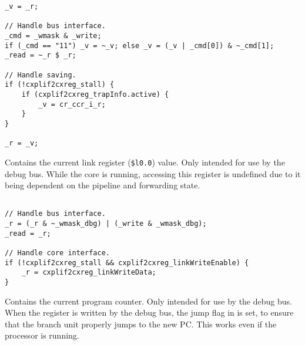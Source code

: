 \declaration{}
\implementation{}
\begin{lstlisting}
_v = _r;

// Handle bus interface.
_cmd = _wmask & _write;
if (_cmd == "11") _v = ~_v; else _v = (_v | _cmd[0]) & ~_cmd[1];
_read = ~_r $ _r;

// Handle saving.
if (!cxplif2cxreg_stall) {
    if (cxplif2cxreg_trapInfo.active) {
        _v = cr_ccr_i_r;
    }
}

_r = _v;
\end{lstlisting}


Contains the current link register (\texttt{\$l0.0}) value. Only intended for
use by the debug bus. While the core is running, accessing this register is
undefined due to it being dependent on the pipeline and forwarding state.

\declaration{}
\implementation{}
\begin{lstlisting}

// Handle bus interface.
_r = (_r & ~_wmask_dbg) | (_write & _wmask_dbg);
_read = _r;

// Handle core interface.
if (!cxplif2cxreg_stall && cxplif2cxreg_linkWriteEnable) {
    _r = cxplif2cxreg_linkWriteData;
}

\end{lstlisting}


Contains the current program counter. Only intended for use by the debug bus.
When the register is written by the debug bus, the jump flag in  is
set, to ensure that the branch unit properly jumps to the new PC. This works
even if the processor is running.


